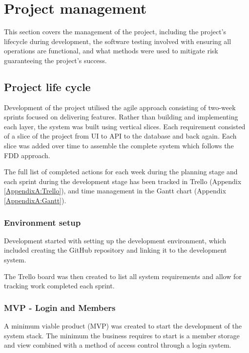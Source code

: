 \chapter{Project management} %
\label{Chapter5} %

This section covers the management of the project, including the project's lifecycle during development, the software testing involved with ensuring all operations are functional, and what methods were used to mitigate risk guaranteeing the project's success.


\section{Project life cycle}

Development of the project utilised the agile approach consisting of two-week sprints focused on delivering features. Rather than building and implementing each layer, the system was built using vertical slices. Each requirement consisted of a slice of the project from UI to API to the database and back again. Each slice was added over time to assemble the complete system which follows the FDD approach.

The full list of completed actions for each week during the planning stage and each sprint during the development stage has been tracked in Trello (Appendix \ref{AppendixA:Trello}), and time management in the Gantt chart (Appendix \ref{AppendixA:Gantt}).


\subsection{Environment setup}
Development started with setting up the development environment, which included creating the GitHub repository and linking it to the development system.

The Trello board was then created to list all system requirements and allow for tracking work completed each sprint.


\subsection{MVP - Login and Members}
A minimum viable product (MVP) was created to start the development of the system stack. The minimum the business requires to start is a member storage and view combined with a method of access control through a login system.

